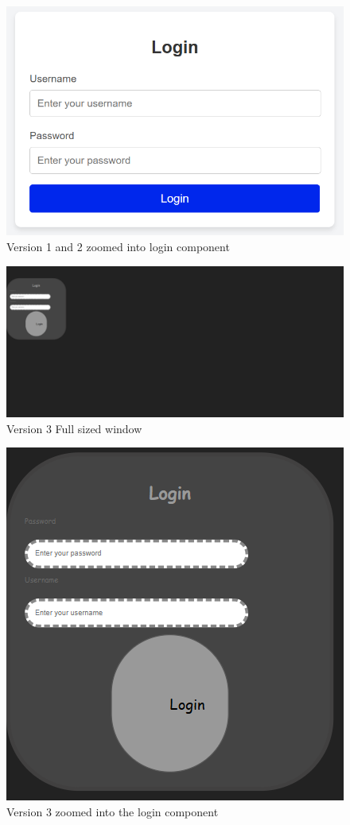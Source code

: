 \documentclass[journal,twocolumn]{IEEEtran}
\begin{document}
\begin{figure}[H]
    \centering
    \includegraphics[width=0.6\linewidth]{login normal.png}
    \caption{Version 1 and 2 zoomed into login component}
    \label{v1-2-zoom}
\end{figure}

\begin{figure}[H]
    \centering
    \includegraphics[width=0.6\linewidth]{V3 full size.png}
    \caption{Version 3 Full sized window}
    \label{v3-full}
\end{figure}

\begin{figure}[H]
    \centering
    \includegraphics[width=0.6\linewidth]{V3 zoomed in.png}
    \caption{Version 3 zoomed into the login component}
    \label{v3-zoom}
\end{figure}
\end{document}
